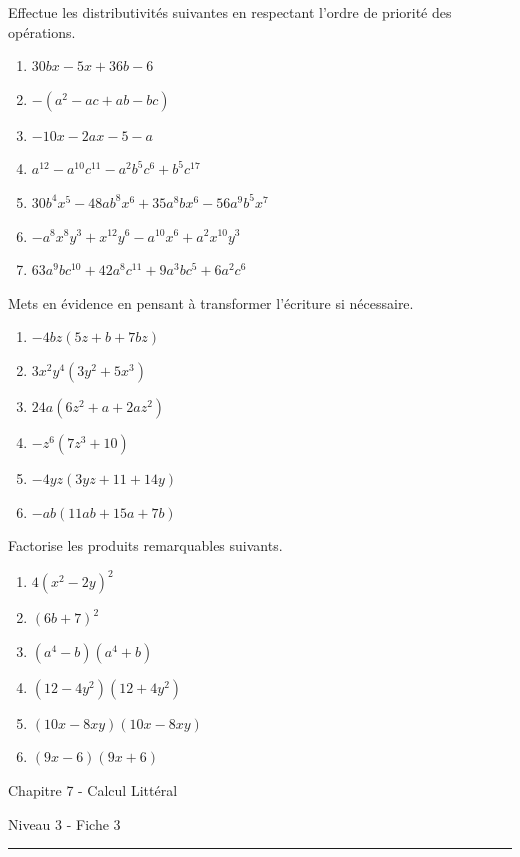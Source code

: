 \documentclass[12pt,parskip=half-, twoside=semi]{scrartcl}
\begin{document}
\begin{exercise}Effectue les distributivités suivantes en respectant l'ordre de priorité des opérations.
  \begin{enumerate}[cols=2]
     \item $30bx-5x+36b-6$
     \item $-(a^2-ac+ab-bc)$
     \item $-10x-2ax-5-a$
     \item $a^{12}-a^{10}c^{11}-a^2b^5c^6+b^5c^{17}$
     \item $30b^4x^5-48ab^8x^6+35a^8bx^6-56a^9b^5x^7$
     \item $-a^8x^8y^3+x^{12}y^6-a^{10}x^6+a^2x^{10}y^3$
     \item $63a^9bc^{10}+42a^8c^{11}+9a^3bc^5+6a^2c^6$
  \end{enumerate}
\end{exercise}


\begin{exercise}Mets en évidence en pensant à transformer l'écriture si nécessaire.
  \begin{enumerate}[cols=3]
      \item $-4bz(5z+b+7bz)$
      \item $3x^2y^4(3y^2+5x^3)$
      \item $24a(6z^2+a+2az^2)$
      \item $-z^6(7z^3+10)$
      \item $-4yz(3yz+11+14y)$
      \item $-ab(11ab+15a+7b)$
  \end{enumerate}
\end{exercise}

\begin{exercise}Factorise les produits remarquables suivants.
  \begin{enumerate}[cols=3]
    \item $4(x^2-2y)^2$
    \item $(6b+7)^2$
    \item $(a^4-b)(a^4+b)$
    \item $(12-4y^2)(12+4y^2)$
    \item $(10x-8xy)(10x-8xy)$
    \item $(9x-6)(9x+6)$
  \end{enumerate}
\end{exercise}

\begin{center}
  \bfseries
  \begin{Huge}
    Chapitre 7 - Calcul Littéral
  \end{Huge}
  \smallbreak
  \begin{large}
    Niveau 3  - Fiche 3
  \end{large}
  \smallbreak
  \rule[10pt]{.5\linewidth}{1 pt}
\end{center}
\end{document}
